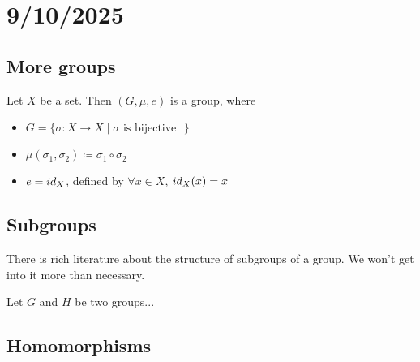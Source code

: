 \section*{9/10/2025}

\subsection*{More groups}

\begin{example}
    Let $X$ be a set. Then $(G,\mu,e)$ is a group, where
    \begin{itemize}
        \item $G = \{ \text{$\sigma:X\to X \mid \text{$\sigma$ is bijective}$ } \}$ %
        \item $\mu(\sigma_1,\sigma_2) \coloneq \sigma_1\circ\sigma_2$
        \item $e = id_X$, defined by $\forall x\in X$, $id_X(x) = x$
    \end{itemize}
\end{example}


\subsection*{Subgroups}
There is rich literature about the structure of subgroups of a group.
We won't get into it more than necessary.
\begin{definition}
    Let $G$ and $H$ be two groups...
\end{definition}


\subsection*{Homomorphisms}

\begin{example}[$\det$]
    
\end{example}


\begin{example}[$n \mapsto kn$]
    
\end{example}



